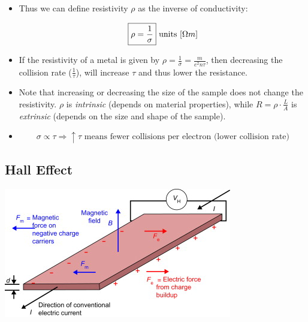 \begin{itemize}
    \item Thus we can define resistivity $\rho$ as the inverse of conductivity:
    
    \[ \boxed{\rho = \frac{1}{\sigma} }  \text{ units } \brackets*{\Omega m}\]

    \item If the resistivity of a metal is given by $\rho = \frac{1}{\sigma} = \frac{m}{e^2 n \tau}$, then decreasing the collision rate ($\frac{1}{\tau}$), will increase $\tau$ and thus lower the resistance.
    
    \item Note that increasing or decreasing the size of the sample does not change the resistivity. $\rho$ is \emph{intrinsic} (depends on material properties), while $R= \rho \cdot \frac{L}{A}$ is \emph{extrinsic} (depends on the size and shape of the sample).

    \item \[ \sigma \propto \tau \Rightarrow \uparrow \tau \text{ means fewer collisions per electron (lower collision rate)} \]
\end{itemize}

\subsection{Hall Effect}
\begin{center}
    \includegraphics[width = 0.4 \linewidth]{Images/hall-effect.jpg}
\end{center}

